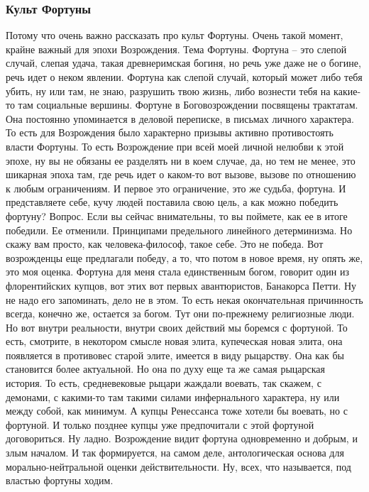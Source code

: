 \subsubsection{Культ Фортуны}

Потому что очень важно рассказать про культ Фортуны. Очень такой момент, крайне
важный для эпохи Возрождения. Тема Фортуны. Фортуна – это слепой случай, слепая
удача, такая древнеримская богиня, но речь уже даже не о богине, речь идет о
неком явлении. Фортуна как слепой случай, который может либо тебя убить, ну или
там, не знаю, разрушить твою жизнь, либо вознести тебя на какие-то там
социальные вершины. Фортуне в Боговозрождении посвящены трактатам. Она постоянно
упоминается в деловой переписке, в письмах личного характера. То есть для
Возрождения было характерно призывы активно противостоять власти Фортуны. То
есть Возрождение при всей моей личной нелюбви к этой эпохе, ну вы не обязаны ее
разделять ни в коем случае, да, но тем не менее, это шикарная эпоха там, где
речь идет о каком-то вот вызове, вызове по отношению к любым ограничениям. И
первое это ограничение, это же судьба, фортуна. И представляете себе, кучу людей
поставила свою цель, а как можно победить фортуну? Вопрос. Если вы сейчас
внимательны, то вы поймете, как ее в итоге победили. Ее отменили. Принципами
предельного линейного детерминизма. Но скажу вам просто, как человека-философ,
такое себе. Это не победа. Вот возрожденцы еще предлагали победу, а то, что
потом в новое время, ну опять же, это моя оценка. Фортуна для меня стала
единственным богом, говорит один из флорентийских купцов, вот этих вот первых
авантюристов, Банакорса Петти. Ну не надо его запоминать, дело не в этом. То
есть некая окончательная причинность всегда, конечно же, остается за богом. Тут
они по-прежнему религиозные люди. Но вот внутри реальности, внутри своих
действий мы боремся с фортуной. То есть, смотрите, в некотором смысле новая
элита, купеческая новая элита, она появляется в противовес старой элите, имеется
в виду рыцарству. Она как бы становится более актуальной. Но она по духу еще та
же самая рыцарская история. То есть, средневековые рыцари жаждали воевать, так
скажем, с демонами, с какими-то там такими силами инфернального характера, ну
или между собой, как минимум. А купцы Ренессанса тоже хотели бы воевать, но с
фортуной. И только позднее купцы уже предпочитали с этой фортуной договориться.
Ну ладно. Возрождение видит фортуна одновременно и добрым, и злым началом. И так
формируется, на самом деле, антологическая основа для морально-нейтральной
оценки действительности. Ну, всех, что называется, под властью фортуны ходим.
